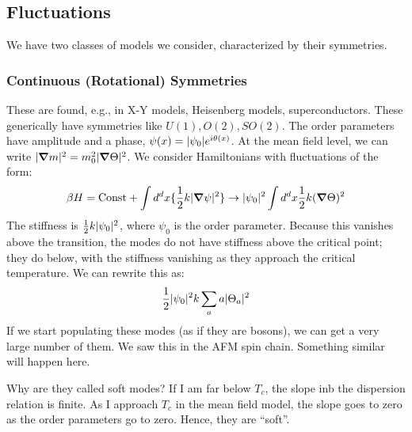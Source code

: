 \subsection{Fluctuations}
We have two classes of models we consider, characterized by their symmetries.

\subsubsection*{Continuous (Rotational) Symmetries}
These are found, e.g., in X-Y models, Heisenberg models, superconductors. These generically have symmetries like $U(1), O(2), SO(2)$. The order parameters have amplitude and a phase, $\psi(x) = \lvert \psi_0 \rvert e^{i\theta(x)}$. At the mean field level, we can write $\abs{\nabla m}^2 = m_0^2 \abs{\nabla \Theta}^2$. We consider Hamiltonians with fluctuations of the form:
\begin{equation}
    \beta H = \text{Const} + \int d^d x\{\frac{1}{2}k\abs{\nabla\psi}^2\} \to \abs{\psi_0}^2\int d^dx \frac{1}{2}k(\nabla \Theta)^2 
\end{equation}
The stiffness is $\frac{1}{2}k\lvert \psi_0 \rvert^2$, where $\psi_0$ is the order parameter. Because this vanishes above the transition, the modes do not have stiffness above the critical point; they do below, with the stiffness vanishing as they approach the critical temperature. We can rewrite this as:
\begin{equation}
    \frac{1}{2}\lvert \psi_0 \rvert^2k\sum_a a \lvert \Theta_a \rvert^2
\end{equation}
If we start populating these modes (as if they are bosons), we can get a very large number of them. We saw this in the AFM spin chain. Something similar will happen here. 

Why are they called soft modes? If I am far below $T_c$, the slope inb the dispersion relation is finite. As I approach $T_c$ in the mean field model, the slope goes to zero as the order parameters go to zero. Hence, they are ``soft''.

